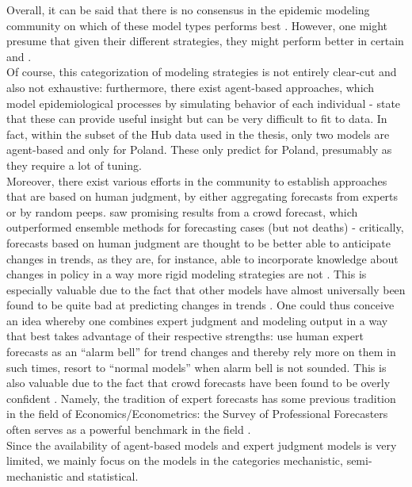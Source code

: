 Overall, it can be said that there is no consensus in the epidemic modeling community on which of these model types performs best \cite{moran_epidemic_2016}. However, one might presume that given their different strategies, they might perform better in certain and .  \\
Of course, this categorization of modeling strategies is not entirely clear-cut and also not  exhaustive: furthermore, there exist agent-based approaches, which model epidemiological processes by simulating behavior of each individual - \cite{zelner_accounting_2021} state that these can provide useful insight but can be very difficult to fit to data. In fact, within the subset of the Hub data used in the thesis, only two models are agent-based and only for Poland. These only predict for Poland, presumably as they require a lot of tuning. \\
Moreover, there exist various efforts in the community to establish approaches that are based on human judgment, by either aggregating forecasts from experts or by random peeps. \cite{bosse_comparing_2021-1} saw promising results from a crowd forecast, which outperformed ensemble methods for forecasting cases (but not deaths) - critically, forecasts based on human judgment are thought to be better able to anticipate changes in trends, as they are, for instance, able to incorporate knowledge about changes in policy in a way more rigid modeling strategies are not \cite{bracher_evaluating_2021}. This is especially valuable due to the fact that other models have almost universally been found to be quite bad at predicting changes in trends . One could thus conceive an idea whereby one combines expert judgment and modeling output in a way that best takes advantage of their respective strengths: use human expert forecasts as an ``alarm bell'' for trend changes and thereby rely more on them in such times, resort to ``normal models'' when alarm bell is not sounded. This is also valuable due to the fact that crowd forecasts have been found to be overly confident \cite{bosse_comparing_2021-1}. Namely, the tradition of expert forecasts has some previous tradition in the field of Economics/Econometrics: the Survey of Professional Forecasters often serves as a powerful benchmark in the field .\\
Since the availability of agent-based models and expert judgment models is very limited, we mainly focus on the models in the categories mechanistic, semi-mechanistic and statistical. \\
